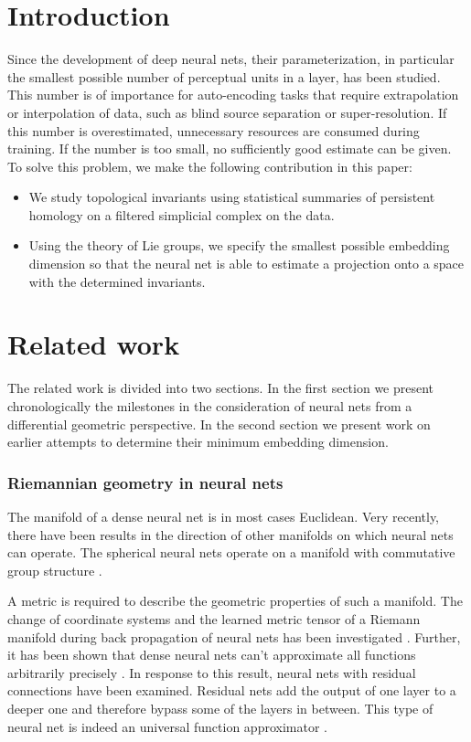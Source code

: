 \documentclass[runningheads,orivec]{llncs}
\begin{document}
\section{Introduction}
Since the development of deep neural nets, their parameterization, in particular the smallest possible number of perceptual units in a layer, has been studied. This number is of importance for auto-encoding tasks that require extrapolation or interpolation of data, such as blind source separation or super-resolution. If this number is overestimated, unnecessary resources are consumed during training. If the number is too small, no sufficiently good estimate can be given. To solve this problem, we make the following contribution in this paper:
\begin{itemize}
    \item We study topological invariants using statistical summaries of persistent homology on a filtered simplicial complex on the data.
    \item Using the theory of Lie groups, we specify the smallest possible embedding dimension so that the neural net is able to estimate a projection onto a space with the determined invariants.
\end{itemize}

\section{Related work}
The related work is divided into two sections. In the first section we present chronologically the milestones in the consideration of neural nets from a differential geometric perspective. In the second section we present work on earlier attempts to determine their minimum embedding dimension.

\subsubsection*{Riemannian geometry in neural nets} The manifold of a dense neural net is in most cases Euclidean. Very recently, there have been results in the direction of other manifolds on which neural nets can operate. The spherical neural nets operate on a manifold with commutative group structure \cite{CohenGKW18,EstevesAMD20}.

A metric is required to describe the geometric properties of such a manifold. The change of coordinate systems and the learned metric tensor of a Riemann manifold during back propagation of neural nets has been investigated \cite{HauserR17}. Further, it has been shown that dense neural nets can't approximate all functions arbitrarily precisely \cite{Johnson19}. In response to this result, neural nets with residual connections have been examined. Residual nets add the output of one layer to a deeper one and therefore bypass some of the layers in between. This type of neural net is indeed an universal function approximator \cite{LinJ18}. 
\end{document}
